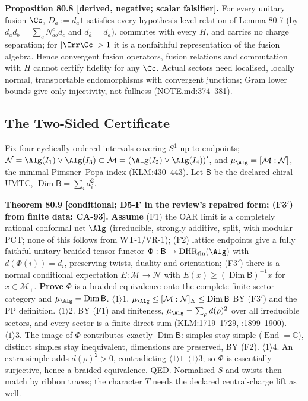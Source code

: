 \textbf{Proposition 80.8 [derived, negative; scalar falsifier].}  For every unitary fusion \(\Cc\), \(D_a:=d_a1\)
satisfies every hypothesis-level relation of Lemma 80.7 (by \(d_ad_b=\sum_cN_{ab}^cd_c\) and
\(d_{\bar a}=d_a\)), commutes with every \(H\), and carries no charge separation; for \(|\Irr\Cc|>1\) it is a
nonfaithful representation of the fusion algebra.  Hence convergent fusion operators, fusion relations and
commutation with \(H\) cannot certify fidelity for any \(\Cc\).  Actual sectors need localised, locally
normal, transportable endomorphisms with convergent junctions; Gram lower bounds give only injectivity, not
fullness (NOTE.md:374--381).

\subsection{The Two-Sided Certificate}

Fix four cyclically ordered intervals covering \(S^1\) up to endpoints;
\(\mathcal N=\Alg(I_1)\vee\Alg(I_3)\subset\mathcal M=(\Alg(I_2)\vee\Alg(I_4))'\), and
\(\mu_\Alg=[\mathcal M:\mathcal N]\), the minimal Pimsner--Popa index (KLM:430--443).  Let \(\mathsf B\) be the
declared chiral UMTC, \(\operatorname{Dim}\mathsf B=\sum_id_i^2\).

\textbf{Theorem 80.9 [conditional; D5-F in the review's repaired form; (F3\('\)) from finite data: CA-93].}  \textbf{Assume}
(F1) the OAR limit is a completely rational conformal net \(\Alg\) (irreducible, strongly additive, split,
with modular PCT; none of this follows from WT-1/VR-1);
(F2) lattice endpoints give a fully faithful unitary braided tensor functor
\(\Phi:\mathsf B\to\mathrm{DHR}_{\mathrm{fin}}(\Alg)\) with \(d(\Phi(i))=d_i\), preserving twists, duality
and orientation;
(F3\('\)) there is a normal conditional expectation \(E:\mathcal M\to\mathcal N\) with
\(E(x)\ge(\operatorname{Dim}\mathsf B)^{-1}x\) for \(x\in\mathcal M_+\).
\textbf{Prove} \(\Phi\) is a braided equivalence onto the complete finite-sector category and
\(\mu_\Alg=\operatorname{Dim}\mathsf B\).
\(\langle1\rangle1\). \(\mu_\Alg\le[\mathcal M:\mathcal N]_E\le\operatorname{Dim}\mathsf B\) BY (F3\('\)) and
the PP definition.  \(\langle1\rangle2\). BY (F1) and finiteness, \(\mu_\Alg=\sum_\rho d(\rho)^2\) over all
irreducible sectors, and every sector is a finite direct sum (KLM:1719--1729, :1899--1900).
\(\langle1\rangle3\). The image of \(\Phi\) contributes exactly \(\operatorname{Dim}\mathsf B\): simples stay
simple (\(\operatorname{End}=\mathbb C\)), distinct simples stay inequivalent, dimensions are preserved, BY (F2).
\(\langle1\rangle4\). An extra simple adds \(d(\rho)^2>0\), contradicting \(\langle1\rangle1\)--\(\langle1\rangle3\);
so \(\Phi\) is essentially surjective, hence a braided equivalence.  QED.  Normalised \(S\) and twists then
match by ribbon traces; the character \(T\) needs the declared central-charge lift as well.

